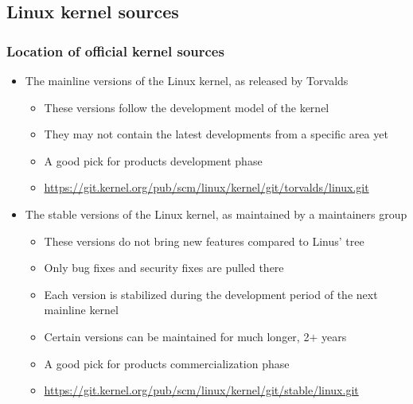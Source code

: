 \subsection{Linux kernel sources}

\begin{frame}
  \frametitle{Location of official kernel sources}
  \begin{itemize}
  \item The mainline versions of the Linux kernel, as released by Torvalds
    \begin{itemize}
    \item These versions follow the development model of the kernel
    \item They may not contain the latest developments from a specific
      area yet
    \item A good pick for products development phase
    \item \url{https://git.kernel.org/pub/scm/linux/kernel/git/torvalds/linux.git}
    \end{itemize}
    \item The stable versions of the Linux kernel, as maintained by a
      maintainers group
    \begin{itemize}
    \item These versions do not bring new features compared to Linus'
      tree
    \item Only bug fixes and security fixes are pulled there
    \item Each version is stabilized during the development period of
      the next mainline kernel
    \item Certain versions can be maintained for much longer, 2$+$ years
    \item A good pick for products commercialization phase
    \item \url{https://git.kernel.org/pub/scm/linux/kernel/git/stable/linux.git}
    \end{itemize}
  \end{itemize}
\end{frame}

